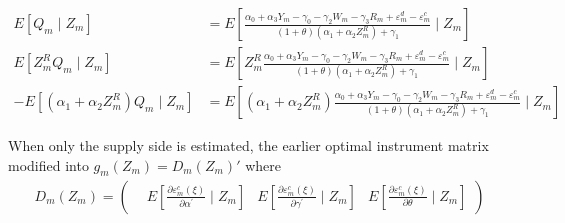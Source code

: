 \documentclass[11pt, a4paper]{article}
\begin{document}
\begin{align*}
    E[Q_{m}\mid Z_{m}] &=E[\frac{\alpha_0 + \alpha_3 Y_m - \gamma_0 - \gamma_2 W_{m} - \gamma_3 R_{m} + \varepsilon^{d}_{m} - \varepsilon^{c}_{m}}{(1 + \theta) (\alpha_1 + \alpha_2 Z^{R}_{m}) + \gamma_1}\mid Z_{m}] \\
    E[Z^{R}_{m}Q_{m}\mid Z_{m}] &=E[Z^{R}_{m}\frac{\alpha_0 + \alpha_3 Y_m - \gamma_0 - \gamma_2 W_{m} - \gamma_3 R_{m} + \varepsilon^{d}_{m} - \varepsilon^{c}_{m}}{(1 + \theta) (\alpha_1 + \alpha_2 Z^{R}_{m}) + \gamma_1}\mid Z_{m}]\\
    -E[(\alpha_1 + \alpha_2 Z^{R}_m)Q_{m}\mid Z_{m}] &=E[(\alpha_1 + \alpha_2 Z^{R}_m)\frac{\alpha_0 + \alpha_3 Y_m - \gamma_0 - \gamma_2 W_{m} - \gamma_3 R_{m} + \varepsilon^{d}_{m} - \varepsilon^{c}_{m}}{(1 + \theta) (\alpha_1 + \alpha_2 Z^{R}_{m}) + \gamma_1}\mid Z_{m}]
\end{align*}







When only the supply side is estimated, the earlier optimal instrument matrix modified into $g_{m}(Z_{m})=D_{m}(Z_{m})'$ where 
\begin{align*}
    D_{m}(Z_{m}) = \begin{pmatrix}
    & E\left[\frac{\partial \varepsilon_{m}^{c}(\xi)}{\partial \alpha^{\prime}} \mid Z_{m}\right] & 
    E\left[\frac{\partial \varepsilon_{m}^{c}(\xi)}{\partial \gamma^{\prime}} \mid Z_{m}\right] & 
    E\left[\frac{\partial \varepsilon_{m}^{c}(\xi)}{\partial \theta} \mid Z_{m}\right]
    \end{pmatrix} 
\end{align*}
\end{document}
